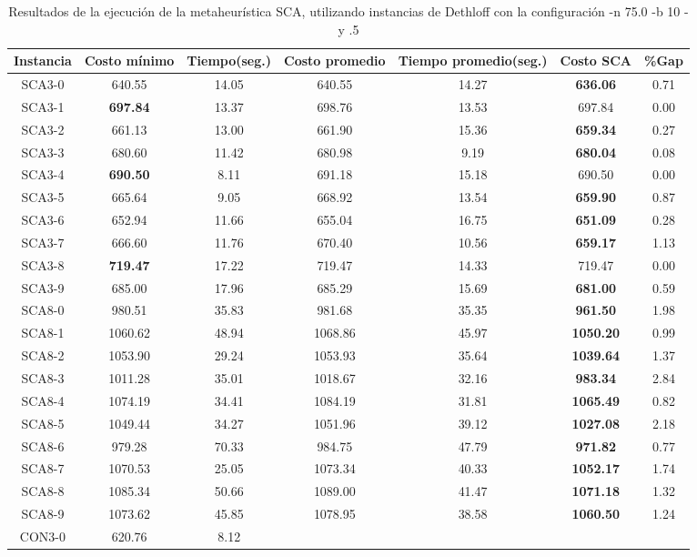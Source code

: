 \begin{table}[ht]
\caption{Resultados de la ejecución de la metaheurística SCA, utilizando instancias de Dethloff con la configuración -n 75.0 -b 10 -y .5}
\centering
\small
\begin{tabular}{c c c c c c c}
\hline\hline
Instancia & Costo mínimo & Tiempo(seg.) & Costo promedio & Tiempo promedio(seg.) & Costo SCA & \%Gap \\ [0.5ex]
\hline
SCA3-0 & 640.55 & 14.05 & 
640.55 & 14.27 & \bf{636.06} & 
0.71\\SCA3-1 & \bf{697.84} & 13.37 & 
698.76 & 13.53 & 697.84 & 0.00\\
SCA3-2 & 661.13 & 13.00 & 
661.90 & 15.36 & \bf{659.34} & 
0.27\\SCA3-3 & 680.60 & 11.42 & 
680.98 & 9.19 & \bf{680.04} & 
0.08\\SCA3-4 & \bf{690.50} & 8.11 & 
691.18 & 15.18 & 690.50 & 0.00\\
SCA3-5 & 665.64 & 9.05 & 
668.92 & 13.54 & \bf{659.90} & 
0.87\\SCA3-6 & 652.94 & 11.66 & 
655.04 & 16.75 & \bf{651.09} & 
0.28\\SCA3-7 & 666.60 & 11.76 & 
670.40 & 10.56 & \bf{659.17} & 
1.13\\SCA3-8 & \bf{719.47} & 17.22 & 
719.47 & 14.33 & 719.47 & 0.00\\
SCA3-9 & 685.00 & 17.96 & 
685.29 & 15.69 & \bf{681.00} & 
0.59\\SCA8-0 & 980.51 & 35.83 & 
981.68 & 35.35 & \bf{961.50} & 
1.98\\SCA8-1 & 1060.62 & 48.94 & 
1068.86 & 45.97 & \bf{1050.20} & 
0.99\\SCA8-2 & 1053.90 & 29.24 & 
1053.93 & 35.64 & \bf{1039.64} & 
1.37\\SCA8-3 & 1011.28 & 35.01 & 
1018.67 & 32.16 & \bf{983.34} & 
2.84\\SCA8-4 & 1074.19 & 34.41 & 
1084.19 & 31.81 & \bf{1065.49} & 
0.82\\SCA8-5 & 1049.44 & 34.27 & 
1051.96 & 39.12 & \bf{1027.08} & 
2.18\\SCA8-6 & 979.28 & 70.33 & 
984.75 & 47.79 & \bf{971.82} & 
0.77\\SCA8-7 & 1070.53 & 25.05 & 
1073.34 & 40.33 & \bf{1052.17} & 
1.74\\SCA8-8 & 1085.34 & 50.66 & 
1089.00 & 41.47 & \bf{1071.18} & 
1.32\\SCA8-9 & 1073.62 & 45.85 & 
1078.95 & 38.58 & \bf{1060.50} & 
1.24\\CON3-0 & 620.76 & 8.12 & 

\end{tabular}
\end{table}
